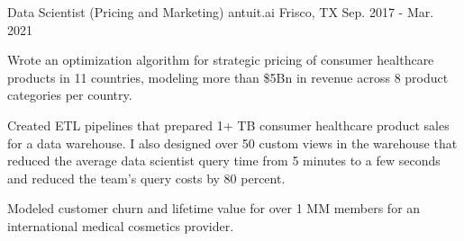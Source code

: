 \begin{cventries}
  \cventry
    {Data Scientist (Pricing and Marketing)} %
    {antuit.ai} %
    {Frisco, TX} %
    {Sep. 2017 - Mar. 2021} %
    {
      \begin{cvitems} %
      \item {
          Wrote an optimization algorithm for strategic pricing of consumer
          healthcare products in 11 countries, modeling more than \$5Bn in
          revenue across 8 product categories per country.
      }
      \item {
          Created ETL pipelines that prepared 1+ TB consumer healthcare
          product sales for a data warehouse.   I also designed over 50 custom
          views in the warehouse that reduced the average data scientist query
          time from 5 minutes to a few seconds and reduced the team's query
          costs by 80 percent.
      }
      \item {
        Modeled customer churn and lifetime value for over 1 MM members for an
        international medical cosmetics provider.
      }
      \end{cvitems}
    }

\end{cventries}
